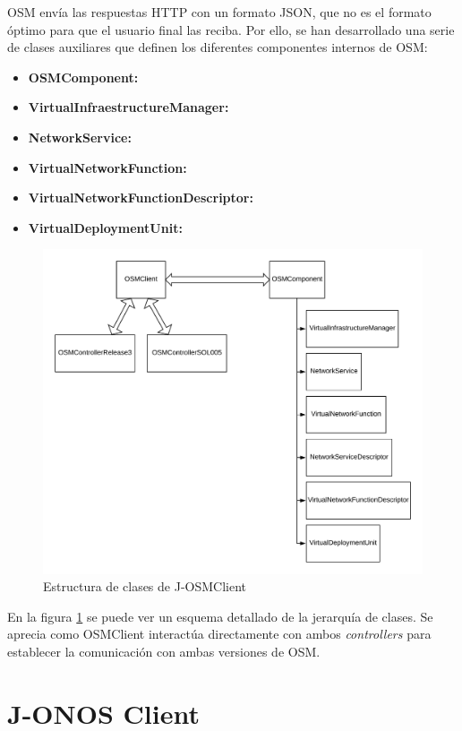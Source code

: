 OSM envía las respuestas HTTP con un formato JSON, que no es el formato óptimo para que el usuario final las reciba. Por ello, se han desarrollado una serie de clases auxiliares que definen los diferentes componentes internos de OSM:

\begin{itemize}
	\item \textbf{OSMComponent:} 
	
	\item \textbf{VirtualInfraestructureManager:} 
	
	\item \textbf{NetworkService:} 
	
	\item \textbf{VirtualNetworkFunction:} 
	
	\item \textbf{VirtualNetworkFunctionDescriptor:} 
	
	\item \textbf{VirtualDeploymentUnit:} 
	
\end{itemize}

\begin{figure}[!ht]
	\centering
	\includegraphics[width=0.8\linewidth]{imagenes/OSMClient}
	\caption{Estructura de clases de J-OSMClient}
	\label{fig:osmclient}
\end{figure}

En la figura \ref{fig:osmclient} se puede ver un esquema detallado de la jerarquía de clases. Se aprecia como OSMClient interactúa directamente con ambos \textit{controllers} para establecer la comunicación con ambas versiones de OSM.


\section{J-ONOS Client}
\label{sec:onosclient}

